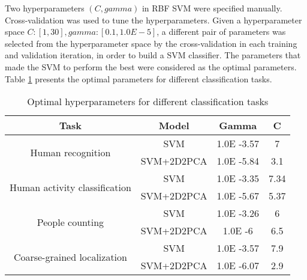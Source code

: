 Two hyperparameters $(C, gamma)$ in RBF SVM were specified manually. Cross-validation was used to tune the hyperparameters. Given a hyperparameter space  $C: [1,30],gamma:[0.1,1.0E-5]$, a different pair of parameters was selected from the hyperparameter space by the cross-validation in each training and validation iteration, in order to build a SVM classifier. The parameters that made the SVM to perform the best were considered as the optimal parameters. Table \ref{tb-svmhp} presents the optimal parameters for different classification tasks.
\begin{table}[]
\centering
\caption{Optimal hyperparameters for different classification tasks}
\label{tb-svmhp}
\begin{tabular}{|c|c|c|c|}
\hline
\textbf{Task}                                  & \textbf{Model} & \textbf{Gamma} & \textbf{C} \\ \hline
\multirow{2}{*}{Human recognition}             & SVM            & 1.0E -3.57     & 7          \\ \cline{2-4} 
                                               & SVM+2D2PCA     & 1.0E -5.84     & 3.1        \\ \hline
\multirow{2}{*}{Human activity classification} & SVM            & 1.0E -3.35     & 7.34       \\ \cline{2-4} 
                                               & SVM+2D2PCA     & 1.0E -5.67     & 5.37       \\ \hline
\multirow{2}{*}{People counting}               & SVM            & 1.0E -3.26     & 6          \\ \cline{2-4} 
                                               & SVM+2D2PCA     & 1.0E -6        & 6.5        \\ \hline
\multirow{2}{*}{Coarse-grained localization}   & SVM            & 1.0E -3.57     & 7.9        \\ \cline{2-4} 
                                               & SVM+2D2PCA     & 1.0E -6.07     & 2.9        \\ \hline
\end{tabular}
\end{table}

